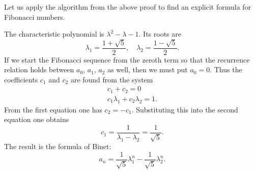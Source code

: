 Let us apply the algorithm from the above proof to find an explicit formula for Fibonacci numbers.

The characteristic polynomial is $\lambda^2 - \lambda - 1$. Its roots are
\begin{equation}
\label{eqn:FibRoots}
\lambda_1 = \frac{1 + \sqrt{5}}2, \quad \lambda_2 = \frac{1 - \sqrt{5}}2.
\end{equation}
If we start the Fibonacci sequence from the zeroth term so that the recurrence relation holds between $a_0$, $a_1$, $a_2$ as well,
then we must put $a_0 = 0$.
Thus the coefficients $c_1$ and $c_2$ are found from the system
\begin{gather*}
c_1 + c_2 = 0\\
c_1\lambda_1 + c_2\lambda_2 = 1.
\end{gather*}
From the first equation one has $c_2 = -c_1$. Substituting this into the second equation one obtains
\[
c_1 = \frac{1}{\lambda_1 - \lambda_2} = \frac{1}{\sqrt{5}}.
\]
The result is the formula of Binet:
\[
a_n = \frac{1}{\sqrt{5}} \lambda_1^n - \frac{1}{\sqrt{5}} \lambda_2^n.
\]

